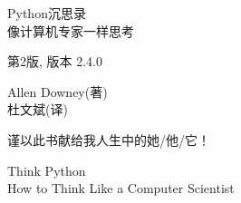 \documentclass[10pt]{book}
\newcommand{\thedate}{}
\begin{document}
\begin{latexonly}

\renewcommand{\blankpage}{\thispagestyle{empty} \quad \newpage}



\thispagestyle{empty}

\begin{flushright}
\vspace*{2.0in}

\begin{spacing}{3}
{\huge Python沉思录}\\
{\Large 像计算机专家一样思考}
\end{spacing}

\vspace{0.25in}

{\small 第2版, 版本 2.4.0}

\thedate
\vspace{1in}

{\Large
	Allen Downey(著)\\
}
{\small 杜文斌(译)}
\vspace{0.5in}

\vfill

\end{flushright}


\blankpage
\vspace*{1.0in}
\begin{center}
{\Large 谨以此书献给我人生中的她/他/它！}
\end{center}
\blankpage

\pagebreak
\thispagestyle{empty}

\begin{flushright}
\vspace*{2.0in}

\begin{spacing}{3}
{\huge Think Python}\\
{\Large How to Think Like a Computer Scientist}
\end{spacing}


\end{flushright}
\end{latexonly}
\end{document}
